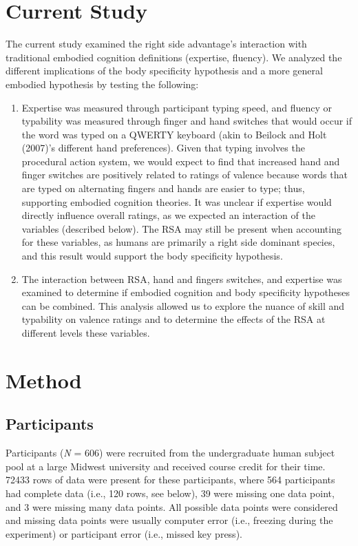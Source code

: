 \documentclass[english,man]{apa6}
\providecommand{\tightlist}{%
  \setlength{\itemsep}{0pt}\setlength{\parskip}{0pt}}
\theoremstyle{definition}
\theoremstyle{definition}
\theoremstyle{definition}
\theoremstyle{remark}
\begin{document}
\section{Current Study}\label{current-study}

The current study examined the right side advantage's interaction with
traditional embodied cognition definitions (expertise, fluency). We
analyzed the different implications of the body specificity hypothesis
and a more general embodied hypothesis by testing the following:

\begin{enumerate}
\def\labelenumi{\arabic{enumi})}
\tightlist
\item
  Expertise was measured through participant typing speed, and fluency
  or typability was measured through finger and hand switches that would
  occur if the word was typed on a QWERTY keyboard (akin to Beilock and
  Holt (2007)'s different hand preferences). Given that typing involves
  the procedural action system, we would expect to find that increased
  hand and finger switches are positively related to ratings of valence
  because words that are typed on alternating fingers and hands are
  easier to type; thus, supporting embodied cognition theories. It was
  unclear if expertise would directly influence overall ratings, as we
  expected an interaction of the variables (described below). The RSA
  may still be present when accounting for these variables, as humans
  are primarily a right side dominant species, and this result would
  support the body specificity hypothesis.
\item
  The interaction between RSA, hand and fingers switches, and expertise
  was examined to determine if embodied cognition and body specificity
  hypotheses can be combined. This analysis allowed us to explore the
  nuance of skill and typability on valence ratings and to determine the
  effects of the RSA at different levels these variables.
\end{enumerate}

\section{Method}\label{method}

\subsection{Participants}\label{participants}

Participants (\emph{N} = 606) were recruited from the undergraduate
human subject pool at a large Midwest university and received course
credit for their time. 72433 rows of data were present for these
participants, where 564 participants had complete data (i.e., 120 rows,
see below), 39 were missing one data point, and 3 were missing many data
points. All possible data points were considered and missing data points
were usually computer error (i.e., freezing during the experiment) or
participant error (i.e., missed key press).
\end{document}
